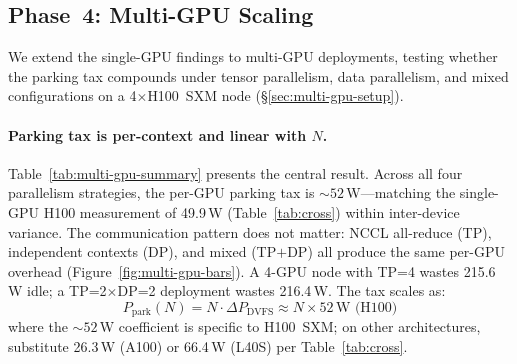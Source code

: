 \documentclass[sigconf,nonacm]{acmart}
\begin{document}
\subsection{Phase~4: Multi-GPU Scaling}
\label{sec:multi-gpu}

We extend the single-GPU findings to multi-GPU deployments, testing whether the parking tax compounds under tensor parallelism, data parallelism, and mixed configurations on a 4$\times$H100~SXM node (\S\ref{sec:multi-gpu-setup}).

\paragraph{Parking tax is per-context and linear with $N$.} Table~\ref{tab:multi-gpu-summary} presents the central result. Across all four parallelism strategies, the per-GPU parking tax is ${\sim}52$\,W---matching the single-GPU H100 measurement of 49.9\,W (Table~\ref{tab:cross}) within inter-device variance. The communication pattern does not matter: NCCL all-reduce (TP), independent contexts (DP), and mixed (TP$+$DP) all produce the same per-GPU overhead (Figure~\ref{fig:multi-gpu-bars}). A 4-GPU node with TP=4 wastes 215.6\,W idle; a TP=2$\times$DP=2 deployment wastes 216.4\,W. The tax scales as:
\begin{equation}
    P_{\text{park}}(N) = N \cdot \Delta P_{\text{DVFS}} \approx N \times 52\,\text{W (H100)}
    \label{eq:linear-scaling}
\end{equation}
where the ${\sim}52$\,W coefficient is specific to H100~SXM; on other architectures, substitute 26.3\,W (A100) or 66.4\,W (L40S) per Table~\ref{tab:cross}.
\end{document}
